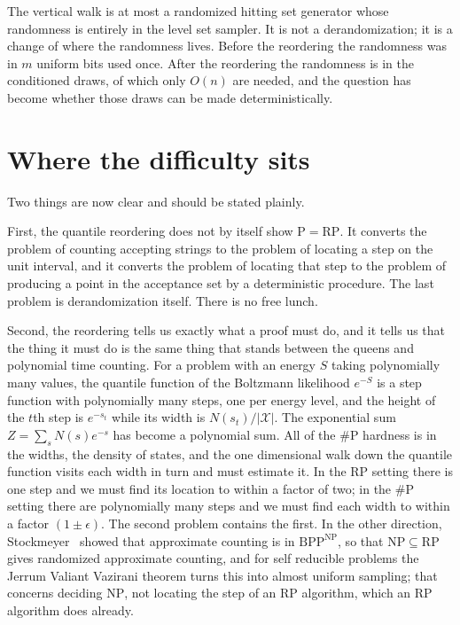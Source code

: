 \documentclass[11pt,twoside,openany]{book}
\theoremstyle{plain}
\theoremstyle{definition}
\theoremstyle{remark}
\newcommand{\cX}{\mathcal{X}}
\newcommand{\RP}{\mathrm{RP}}
\newcommand{\BPP}{\mathrm{BPP}}
\newcommand{\NP}{\mathrm{NP}}
\newcommand{\Pc}{\mathrm{P}}
\newcommand{\sharpP}{\#\mathrm{P}}
\begin{document}
The vertical walk is at most a randomized hitting set generator whose randomness is entirely in the level set sampler. It is not a derandomization; it is a change of where the randomness lives. Before the reordering the randomness was in $m$ uniform bits used once. After the reordering the randomness is in the conditioned draws, of which only $O(n)$ are needed, and the question has become whether those draws can be made deterministically.

\section{Where the difficulty sits}

Two things are now clear and should be stated plainly.

First, the quantile reordering does not by itself show $\Pc = \RP$. It converts the problem of counting accepting strings to the problem of locating a step on the unit interval, and it converts the problem of locating that step to the problem of producing a point in the acceptance set by a deterministic procedure. The last problem is derandomization itself. There is no free lunch.

Second, the reordering tells us exactly what a proof must do, and it tells us that the thing it must do is the same thing that stands between the queens and polynomial time counting. For a problem with an energy $S$ taking polynomially many values, the quantile function of the Boltzmann likelihood $e^{-S}$ is a step function with polynomially many steps, one per energy level, and the height of the $t$th step is $e^{-s_t}$ while its width is $N(s_t) / |\cX|$. The exponential sum $Z = \sum_s N(s) e^{-s}$ has become a polynomial sum. All of the $\sharpP$ hardness is in the widths, the density of states, and the one dimensional walk down the quantile function visits each width in turn and must estimate it. In the $\RP$ setting there is one step and we must find its location to within a factor of two; in the $\sharpP$ setting there are polynomially many steps and we must find each width to within a factor $(1 \pm \epsilon)$. The second problem contains the first. In the other direction, Stockmeyer~\cite{Stockmeyer} showed that approximate counting is in $\BPP^{\NP}$, so that $\NP \subseteq \RP$ gives randomized approximate counting, and for self reducible problems the Jerrum Valiant Vazirani theorem turns this into almost uniform sampling; that concerns deciding $\NP$, not locating the step of an $\RP$ algorithm, which an $\RP$ algorithm does already.
\end{document}
